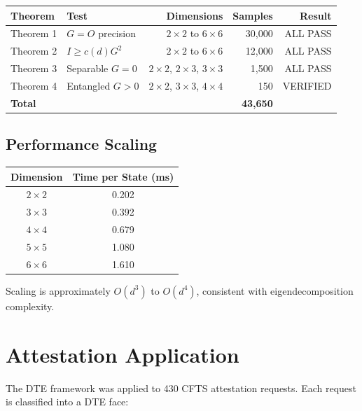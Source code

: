 \documentclass[11pt,a4paper]{article}
\theoremstyle{definition}
\begin{document}
\begin{table}[h]
\centering
\begin{tabular}{llrrr}
\toprule
\textbf{Theorem} & \textbf{Test} & \textbf{Dimensions} & \textbf{Samples} & \textbf{Result} \\
\midrule
Theorem 1 & $G = O$ precision & $2\times2$ to $6\times6$ & 30,000 & ALL PASS \\
Theorem 2 & $I \geq c(d)G^2$ & $2\times2$ to $6\times6$ & 12,000 & ALL PASS \\
Theorem 3 & Separable $G = 0$ & $2\times2$, $2\times3$, $3\times3$ & 1,500 & ALL PASS \\
Theorem 4 & Entangled $G > 0$ & $2\times2$, $3\times3$, $4\times4$ & 150 & VERIFIED \\
\midrule
\textbf{Total} & & & \textbf{43,650} & \\
\bottomrule
\end{tabular}
\end{table}

\subsection{Performance Scaling}

\begin{table}[h]
\centering
\begin{tabular}{cc}
\toprule
\textbf{Dimension} & \textbf{Time per State (ms)} \\
\midrule
$2 \times 2$ & 0.202 \\
$3 \times 3$ & 0.392 \\
$4 \times 4$ & 0.679 \\
$5 \times 5$ & 1.080 \\
$6 \times 6$ & 1.610 \\
\bottomrule
\end{tabular}
\end{table}

Scaling is approximately $O(d^3)$ to $O(d^4)$, consistent with eigendecomposition complexity.

\section{Attestation Application}

The DTE framework was applied to 430 CFTS attestation requests. Each request is classified into a DTE face:
\end{document}
